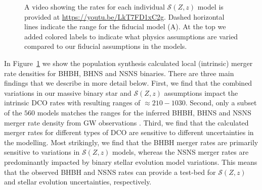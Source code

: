 \documentclass[fleqn,usenatbib]{mnras}
\newcommand{\SFRD}{\ensuremath{\mathcal{S}(Z,z)}\xspace}
\newcommand{\Nmodels}{\ensuremath{560}\xspace}
\begin{document}
\begin{figure}
{    A video showing the rates for each individual \SFRD model is provided at \url{https://youtu.be/LkT7FD1xC2g}. 
    Dashed horizontal lines indicate the range for the fiducial model (A). At the top we added colored labels to indicate what physics assumptions are varied compared to our fiducial assumptions in the models. \href{https://github.com/FloorBroekgaarden/Double-Compact-Object-Mergers/blob/main/plottingCode/Fig_2/Rates_intrinsic_with_GWTC2-2.pdf}{\faFileImage} \href{https://github.com/FloorBroekgaarden/Double-Compact-Object-Mergers/blob/main/plottingCode/Fig_2/make_Figure_2.ipynb}{\faBook}
    }%
    \label{fig:IntrinsicRatesBBHBNSBHNS}
\end{figure}

In Figure~\ref{fig:IntrinsicRatesBBHBNSBHNS} we show the population synthesis calculated local (intrinsic) merger rate densities for \ac{BHBH}, \ac{BHNS} and \ac{NSNS} binaries. There are three main findings that we describe in more detail below. First, we find that the combined variations in our massive binary star and \SFRD assumptions impact the intrinsic \ac{DCO} rates with resulting ranges of $\approx 210{-}1030$. Second, only a subset of the \Nmodels models matches the ranges for the inferred \ac{BHBH}, \ac{BHNS} and \ac{NSNS} merger rate density from \ac{GW} observations \citep{Abbott:2021GWTC3pop}. Third, we find that the calculated merger rates for different types of \ac{DCO} are sensitive to different uncertainties in the modelling.  Most strikingly, we find that the \ac{BHBH} merger rates are primarily sensitive to variations in \SFRD models, whereas the \ac{NSNS} merger rates are predominantly impacted by binary stellar evolution model variations. This means that the observed \ac{BHBH} and \ac{NSNS} rates can provide a test-bed for \SFRD and stellar evolution uncertainties, respectively. %
\end{document}
